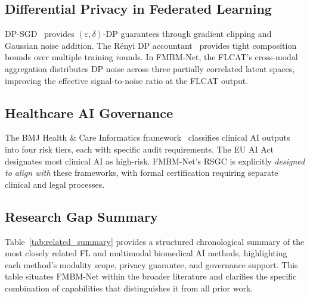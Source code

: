 \documentclass{ieeeaccess}
\begin{document}
\subsection{Differential Privacy in Federated Learning}

DP-SGD~\cite{abadi2016dpsgd} provides $(\varepsilon,\delta)$-DP guarantees
through gradient clipping and Gaussian noise addition. The R\'{e}nyi DP
accountant~\cite{mironov2017renyi} provides tight composition bounds over
multiple training rounds. In FMBM-Net, the FLCAT's cross-modal aggregation
distributes DP noise across three partially correlated latent spaces,
improving the effective signal-to-noise ratio at the FLCAT output.

\subsection{Healthcare AI Governance}

The BMJ Health \& Care Informatics framework~\cite{bmj_governance_2026}
classifies clinical AI outputs into four risk tiers, each with specific
audit requirements. The EU AI Act~\cite{eu_ai_act_2024} designates most
clinical AI as high-risk. FMBM-Net's RSGC is explicitly \emph{designed to
align with} these frameworks, with formal certification requiring separate
clinical and legal processes.

\subsection{Research Gap Summary}

Table~\ref{tab:related_summary} provides a structured chronological summary
of the most closely related FL and multimodal biomedical AI methods,
highlighting each method's modality scope, privacy guarantee, and governance
support. This table situates FMBM-Net within the broader literature and
clarifies the specific combination of capabilities that distinguishes it from
all prior work.
\end{document}
